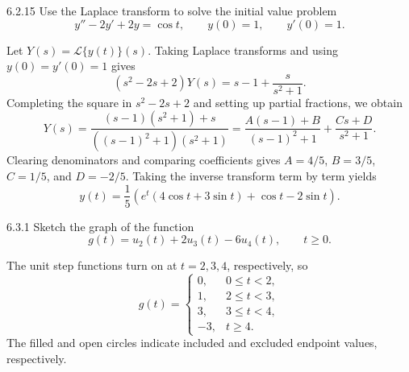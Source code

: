 \documentclass[11pt,oneside]{article}
\begin{document}
\begin{problem}{6.2.15}
Use the Laplace transform to solve the initial value problem
\[
    y''-2y'+2y=\cos t, \qquad y(0)=1, \qquad y'(0)=1.
\]
\end{problem}

\begin{solution}
Let $Y(s)=\mathcal{L}\{y(t)\}(s)$. Taking Laplace transforms and using $y(0)=y'(0)=1$ gives
\[
    (s^2-2s+2)Y(s)=s-1+\frac{s}{s^2+1}.
\]
Completing the square in $s^2-2s+2$ and setting up partial fractions, we obtain
\[
    Y(s)=\frac{(s-1)(s^2+1)+s}{((s-1)^2+1)(s^2+1)}
        =\frac{A(s-1)+B}{(s-1)^2+1}+\frac{Cs+D}{s^2+1}.
\]
Clearing denominators and comparing coefficients gives $A=4/5$, $B=3/5$, $C=1/5$, and $D=-2/5$. Taking the inverse transform term by term yields
\[
    \boxed{y(t)=\frac15\left(e^t(4\cos t+3\sin t)
                       +\cos t-2\sin t\right)}.
\]
\end{solution}


\begin{problem}{6.3.1}
Sketch the graph of the function
\[
    g(t)=u_2(t)+2u_3(t)-6u_4(t),
    \qquad t\geq0.
\]
\end{problem}

\begin{solution}
The unit step functions turn on at $t=2, 3, 4$, respectively, so
\[
    g(t)=
    \begin{cases}
        0, & 0\leq t<2,\\
        1, & 2\leq t<3,\\
        3, & 3\leq t<4,\\
        -3, & t\geq4.
    \end{cases}
\]
The filled and open circles indicate included and excluded endpoint values, respectively.
\begin{center}
\end{center}
\end{solution}
\end{document}
